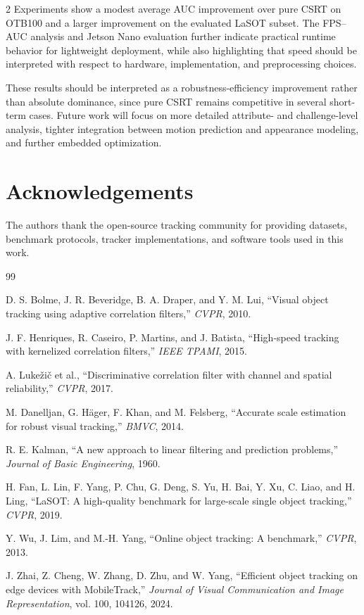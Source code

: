 \documentclass[10pt,a4paper]{article}
\begin{document}
\begin{multicols}{2}
Experiments show a modest average AUC improvement over pure CSRT on OTB100 and a larger improvement on the evaluated LaSOT subset. The FPS--AUC analysis and Jetson Nano evaluation further indicate practical runtime behavior for lightweight deployment, while also highlighting that speed should be interpreted with respect to hardware, implementation, and preprocessing choices.

These results should be interpreted as a robustness-efficiency improvement rather than absolute dominance, since pure CSRT remains competitive in several short-term cases. Future work will focus on more detailed attribute- and challenge-level analysis, tighter integration between motion prediction and appearance modeling, and further embedded optimization.

\section*{Acknowledgements}

The authors thank the open-source tracking community for providing datasets, benchmark protocols, tracker implementations, and software tools used in this work.

\begin{thebibliography}{99}

D. S. Bolme, J. R. Beveridge, B. A. Draper, and Y. M. Lui,
``Visual object tracking using adaptive correlation filters,''
\textit{CVPR}, 2010.

J. F. Henriques, R. Caseiro, P. Martins, and J. Batista,
``High-speed tracking with kernelized correlation filters,''
\textit{IEEE TPAMI}, 2015.

A. Lukežič et al.,
``Discriminative correlation filter with channel and spatial reliability,''
\textit{CVPR}, 2017.

M. Danelljan, G. Häger, F. Khan, and M. Felsberg,
``Accurate scale estimation for robust visual tracking,''
\textit{BMVC}, 2014.

R. E. Kalman,
``A new approach to linear filtering and prediction problems,''
\textit{Journal of Basic Engineering}, 1960.

H. Fan, L. Lin, F. Yang, P. Chu, G. Deng, S. Yu, H. Bai, Y. Xu, C. Liao, and H. Ling,
``LaSOT: A high-quality benchmark for large-scale single object tracking,''
\textit{CVPR}, 2019.

Y. Wu, J. Lim, and M.-H. Yang,
``Online object tracking: A benchmark,''
\textit{CVPR}, 2013.

J. Zhai, Z. Cheng, W. Zhang, D. Zhu, and W. Yang,
``Efficient object tracking on edge devices with MobileTrack,''
\textit{Journal of Visual Communication and Image Representation}, vol. 100, 104126, 2024.

\end{thebibliography}

\end{multicols}
\end{document}
